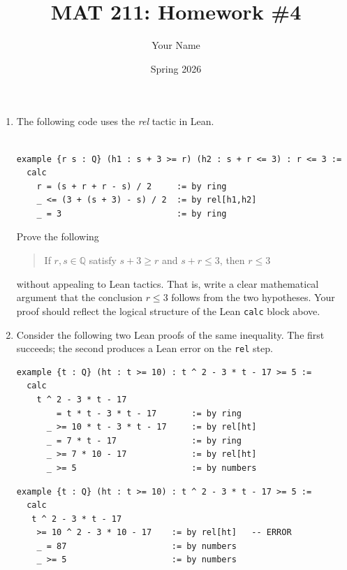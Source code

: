 \documentclass{article}
\title{MAT 211: Homework \#4}
\date{Spring 2026}
\author{Your Name}
\begin{document}
\maketitle 

\lstset{
  basicstyle=\ttfamily\small,
  frame=single,
  breaklines=true
}

\begin{enumerate}

\item The following code uses the \emph{rel} tactic in Lean.

\begin{lstlisting}

example {r s : Q} (h1 : s + 3 >= r) (h2 : s + r <= 3) : r <= 3 :=
  calc
    r = (s + r + r - s) / 2     := by ring
    _ <= (3 + (s + 3) - s) / 2  := by rel[h1,h2]
    _ = 3                       := by ring

\end{lstlisting}

Prove the following \begin{quote}
    If $r, s \in \mathbb{Q}$ satisfy
    $s + 3 \geq r$ and $s + r \leq 3$, then $r \leq 3$
  \end{quote} without appealing to Lean tactics.
  That is, write a clear mathematical argument that the conclusion $r \leq 3$ follows from the
  two hypotheses. Your proof should reflect the logical structure of the Lean \texttt{calc}
  block above.
 

    \item Consider the following two Lean proofs of the same inequality.
The first succeeds; the second produces a Lean error on the \texttt{rel} step.

\begin{lstlisting}[caption={Proof A (succeeds)}]
example {t : Q} (ht : t >= 10) : t ^ 2 - 3 * t - 17 >= 5 :=
  calc
    t ^ 2 - 3 * t - 17
        = t * t - 3 * t - 17       := by ring
      _ >= 10 * t - 3 * t - 17     := by rel[ht]
      _ = 7 * t - 17               := by ring
      _ >= 7 * 10 - 17             := by rel[ht]
      _ >= 5                       := by numbers
\end{lstlisting}

\newpage 

\begin{lstlisting}[caption={Proof B (fails)}]
example {t : Q} (ht : t >= 10) : t ^ 2 - 3 * t - 17 >= 5 :=
  calc
   t ^ 2 - 3 * t - 17
    >= 10 ^ 2 - 3 * 10 - 17    := by rel[ht]   -- ERROR
    _ = 87                     := by numbers
    _ >= 5                     := by numbers
\end{lstlisting}


\end{enumerate}
\end{document}
